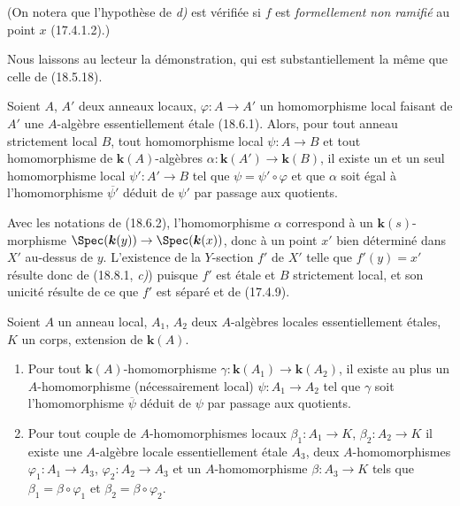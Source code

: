 
(On notera que l'hypothèse de \emph{d)} est vérifiée si $f$ est \emph{formellement non ramifié} au point $x$ (17.4.1.2).)

Nous laissons au lecteur la démonstration, qui est substantiellement la même que celle de (18.5.18).

\begin{lemma}[18.8.4]
\label{IV.18.8.4}
Soient $A$, $A'$ deux anneaux locaux, $\varphi:A\to A'$ un homomorphisme local faisant de $A'$ une $A$-algèbre essentiellement étale \textup{(18.6.1)}. Alors, pour tout anneau strictement local $B$, tout homomorphisme local $\psi:A\to B$ et tout homomorphisme de $\boldsymbol{k}(A)$-algèbres $\alpha:\boldsymbol{k}(A')\to\boldsymbol{k}(B)$, il existe un et un seul homomorphisme local $\psi':A'\to B$ tel que $\psi=\psi'\circ\varphi$ et que $\alpha$ soit égal à l'homomorphisme $\overline{\psi'}$ déduit de $\psi'$ par passage aux quotients.
\end{lemma}

Avec les notations de (18.6.2), l'homomorphisme $\alpha$ correspond à un $\boldsymbol{k}(s)$-morphisme $\Spec(\boldsymbol{k}(y))\to\Spec(\boldsymbol{k}(x))$, donc à un point $x'$ bien déterminé dans $X'$ au-dessus de $y$. L'existence de la $Y$-section $f'$ de $X'$ telle que $f'(y)=x'$ résulte donc de (18.8.1, \emph{c)}) puisque $f'$ est étale et $B$ strictement local, et son unicité résulte de ce que $f'$ est séparé et de (17.4.9).

\begin{lemma}[18.8.5]
\label{IV.18.8.5}
Soient $A$ un anneau local, $A_1$, $A_2$ deux $A$-algèbres locales essentiellement étales, $K$ un corps, extension de $\boldsymbol{k}(A)$.
\begin{enumerate}
  \item[\textup{(i)}] Pour tout $\boldsymbol{k}(A)$-homomorphisme $\gamma:\boldsymbol{k}(A_1)\to\boldsymbol{k}(A_2)$, il existe au plus un $A$-homomorphisme (nécessairement local) $\psi:A_1\to A_2$ tel que $\gamma$ soit l'homomorphisme $\overline\psi$ déduit de $\psi$ par passage aux quotients.
  \item[\textup{(ii)}] Pour tout couple de $A$-homomorphismes locaux $\beta_1:A_1\to K$, $\beta_2:A_2\to K$ il existe une $A$-algèbre locale essentiellement étale $A_3$, deux $A$-homomorphismes $\varphi_1:A_1\to A_3$, $\varphi_2:A_2\to A_3$ et un $A$-homomorphisme $\beta:A_3\to K$ tels que $\beta_1=\beta\circ\varphi_1$ et $\beta_2=\beta\circ\varphi_2$.
\end{enumerate}
\end{lemma}

